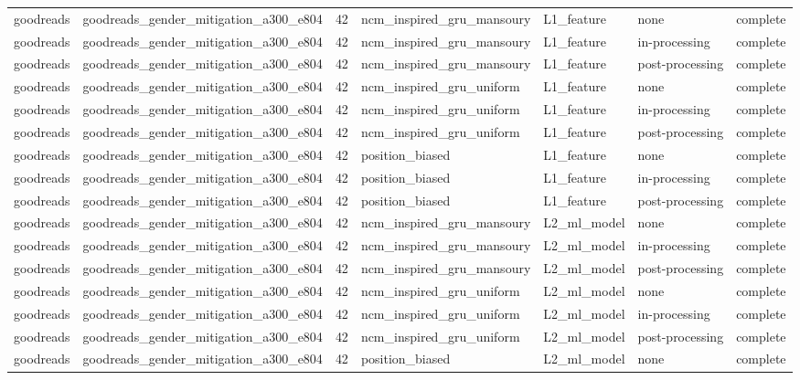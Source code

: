 \begin{table}[htbp!]
\begin{tabular}{llrllll}
goodreads & goodreads\_gender\_mitigation\_a300\_e804 & 42 & ncm\_inspired\_gru\_mansoury & L1\_feature & none & complete \\
goodreads & goodreads\_gender\_mitigation\_a300\_e804 & 42 & ncm\_inspired\_gru\_mansoury & L1\_feature & in-processing & complete \\
goodreads & goodreads\_gender\_mitigation\_a300\_e804 & 42 & ncm\_inspired\_gru\_mansoury & L1\_feature & post-processing & complete \\
goodreads & goodreads\_gender\_mitigation\_a300\_e804 & 42 & ncm\_inspired\_gru\_uniform & L1\_feature & none & complete \\
goodreads & goodreads\_gender\_mitigation\_a300\_e804 & 42 & ncm\_inspired\_gru\_uniform & L1\_feature & in-processing & complete \\
goodreads & goodreads\_gender\_mitigation\_a300\_e804 & 42 & ncm\_inspired\_gru\_uniform & L1\_feature & post-processing & complete \\
goodreads & goodreads\_gender\_mitigation\_a300\_e804 & 42 & position\_biased & L1\_feature & none & complete \\
goodreads & goodreads\_gender\_mitigation\_a300\_e804 & 42 & position\_biased & L1\_feature & in-processing & complete \\
goodreads & goodreads\_gender\_mitigation\_a300\_e804 & 42 & position\_biased & L1\_feature & post-processing & complete \\
goodreads & goodreads\_gender\_mitigation\_a300\_e804 & 42 & ncm\_inspired\_gru\_mansoury & L2\_ml\_model & none & complete \\
goodreads & goodreads\_gender\_mitigation\_a300\_e804 & 42 & ncm\_inspired\_gru\_mansoury & L2\_ml\_model & in-processing & complete \\
goodreads & goodreads\_gender\_mitigation\_a300\_e804 & 42 & ncm\_inspired\_gru\_mansoury & L2\_ml\_model & post-processing & complete \\
goodreads & goodreads\_gender\_mitigation\_a300\_e804 & 42 & ncm\_inspired\_gru\_uniform & L2\_ml\_model & none & complete \\
goodreads & goodreads\_gender\_mitigation\_a300\_e804 & 42 & ncm\_inspired\_gru\_uniform & L2\_ml\_model & in-processing & complete \\
goodreads & goodreads\_gender\_mitigation\_a300\_e804 & 42 & ncm\_inspired\_gru\_uniform & L2\_ml\_model & post-processing & complete \\
goodreads & goodreads\_gender\_mitigation\_a300\_e804 & 42 & position\_biased & L2\_ml\_model & none & complete \\

\end{tabular}
\end{table}
